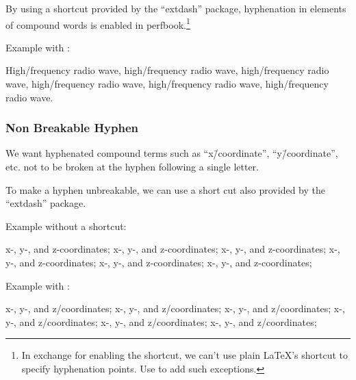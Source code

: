 By using a shortcut \qco{\\-/} provided by the
``extdash'' package, hyphenation in elements of compound
words is enabled in perfbook.\footnote{
  In exchange for enabling the shortcut, we can't use plain
  \LaTeX's shortcut \qco{\\-} to specify hyphenation points.
  Use  to add such exceptions.
}

Example with \qco{\\-/}:

\begin{center}\begin{minipage}{2.55in}\vspace{0.6\baselineskip}
  High\-/frequency radio wave, high\-/frequency radio wave,
  high\-/frequency radio wave, high\-/frequency radio wave,
  high\-/frequency radio wave, high\-/frequency radio wave.
\vspace{0.6\baselineskip}\end{minipage}\end{center}

\subsubsection{Non Breakable Hyphen}
\label{sec:app:styleguide:Non Breakable Hyphen}

We want hyphenated compound terms such as ``x\=/coordinate'',
``y\=/coordinate'', etc. not to be broken at the hyphen
following a single letter.

To make a hyphen unbreakable, we can use a short cut
\qco{\\=/} also provided by the ``extdash'' package.

Example without a shortcut:

\begin{center}\begin{minipage}{2.55in}\vspace{0.6\baselineskip}
x-, y-, and z-coordinates; x-, y-, and z-coordinates;
x-, y-, and z-coordinates; x-, y-, and z-coordinates;
x-, y-, and z-coordinates; x-, y-, and z-coordinates;
\vspace{0.6\baselineskip}\end{minipage}\end{center}

Example with \qco{\\-/}:

\begin{center}\begin{minipage}{2.55in}\vspace{0.6\baselineskip}
x-, y-, and z\-/coordinates; x-, y-, and z\-/coordinates;
x-, y-, and z\-/coordinates; x-, y-, and z\-/coordinates;
x-, y-, and z\-/coordinates; x-, y-, and z\-/coordinates;
\vspace{0.6\baselineskip}\end{minipage}\end{center}

